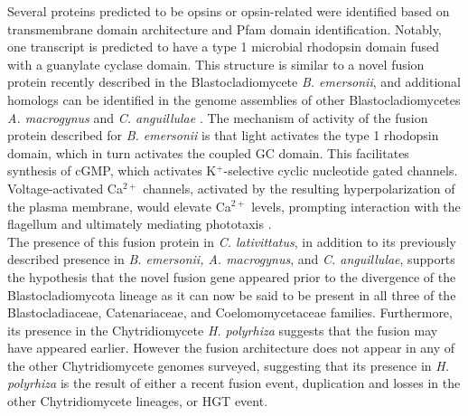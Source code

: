 \indent Several proteins predicted to be opsins or opsin-related were identified based on transmembrane domain architecture and Pfam domain identification. Notably, one transcript is predicted to have a type 1 microbial rhodopsin domain fused with a guanylate cyclase domain. This structure is similar to a novel fusion protein recently described in the Blastocladiomycete \textit{B. emersonii}, and additional homologs can be identified in the genome assemblies of other Blastocladiomycetes \textit{A. macrogynus} and \textit{C.  anguillulae} \cite{Avelar2014}. The mechanism of activity of the fusion protein described for \textit{B. emersonii} is that light activates the type 1 rhodopsin domain, which in turn activates the coupled GC domain. This facilitates synthesis of cGMP, which activates K$^{+}$-selective cyclic nucleotide gated channels. Voltage-activated Ca$^{2+}$ channels, activated by the resulting hyperpolarization of the plasma membrane, would elevate Ca$^{2+}$ levels, prompting interaction with the flagellum and ultimately mediating phototaxis \cite{Avelar2014}. \\
\indent The presence of this fusion protein in \textit{C. lativittatus}, in addition to its previously described presence in \textit{B. emersonii, A. macrogynus}, and \textit{C. anguillulae}, supports the hypothesis that the novel fusion gene appeared prior to the divergence of the Blastocladiomycota lineage as it can now be said to be present in all three of the Blastocladiaceae, Catenariaceae, and Coelomomycetaceae families. Furthermore, its presence in the Chytridiomycete \textit{H. polyrhiza} suggests that the fusion may have appeared earlier. However the fusion architecture does not appear in any of the other Chytridiomycete genomes surveyed, suggesting that its presence in \textit{H. polyrhiza} is the result of either a recent fusion event, duplication and losses in the other Chytridiomycete lineages, or HGT event.\\
